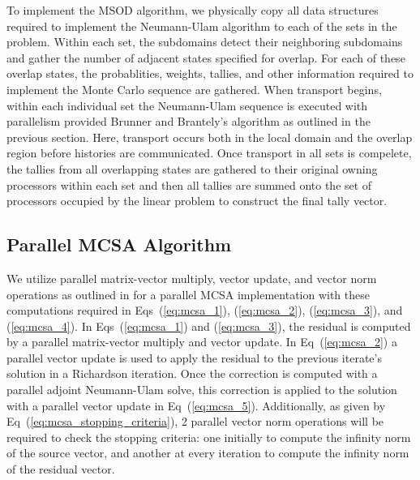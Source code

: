 \documentclass{snamc2013}
\begin{document}
To implement the MSOD algorithm, we physically copy all data
structures required to implement the Neumann-Ulam algorithm to each of
the sets in the problem. Within each set, the subdomains detect their
neighboring subdomains and gather the number of adjacent states
specified for overlap. For each of these overlap states, the
probablities, weights, tallies, and other information required to
implement the Monte Carlo sequence are gathered. When transport
begins, within each individual set the Neumann-Ulam sequence is
executed with parallelism provided Brunner and Brantely's algorithm as
outlined in the previous section. Here, transport occurs both in the
local domain and the overlap region before histories are
communicated. Once transport in all sets is compelete, the tallies
from all overlapping states are gathered to their original owning
processors within each set and then all tallies are summed onto the
set of processors occupied by the linear problem to construct the
final tally vector.

\subsection{Parallel MCSA Algorithm}
We utilize parallel matrix-vector multiply, vector update, and vector
norm operations as outlined in \cite{saad_iterative_2003} for a
parallel MCSA implementation with these computations required in
Eqs~(\ref{eq:mcsa_1}), (\ref{eq:mcsa_2}), (\ref{eq:mcsa_3}), and
(\ref{eq:mcsa_4}). In Eqs~(\ref{eq:mcsa_1}) and (\ref{eq:mcsa_3}), the
residual is computed by a parallel matrix-vector multiply and vector
update. In Eq~(\ref{eq:mcsa_2}) a parallel vector update is used to
apply the residual to the previous iterate's solution in a Richardson
iteration. Once the correction is computed with a parallel adjoint
Neumann-Ulam solve, this correction is applied to the solution with a
parallel vector update in Eq~(\ref{eq:mcsa_5}). Additionally, as given
by Eq~(\ref{eq:mcsa_stopping_criteria}), 2 parallel vector norm
operations will be required to check the stopping criteria: one
initially to compute the infinity norm of the source vector, and
another at every iteration to compute the infinity norm of the
residual vector.
\end{document}
